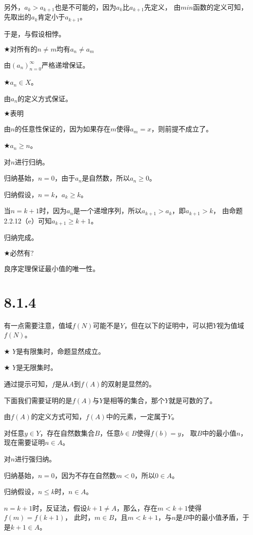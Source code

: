 \documentclass{article}
\theoremstyle{mystyle}
\begin{document}
另外，$a_k > a_{k+1}$也是不可能的，因为$a_k$比$a_{k+1}$先定义，
由$min$函数的定义可知，先取出的$a_k$肯定小于$a_{k+1}$。

于是，与假设相悖。

$\bigstar \textbf{对所有的}n \neq m \textbf{均有} a_n \neq a_m$

由$(a_n)_{n=0}^\infty$严格递增保证。

$\bigstar a_n \in X$。

由$a_n$的定义方式保证。

$\bigstar \textbf{表明}$

由$n$的任意性保证的，因为如果存在$m$使得$a_m = x$，则前提不成立了。


$\bigstar a_n \geq n$。

对$n$进行归纳。

归纳基始，$n=0$，由于$a_n$是自然数，所以$a_n \geq 0$。

归纳假设，$n=k$，$a_k \geq k$。

当$n=k+1$时，因为$a_n$是一个递增序列，所以$a_{k+1} > a_k$，即$a_{k+1} > k$，
由命题2.2.12（e）可知$a_{k+1} \geq k+1$。

归纳完成。

$\bigstar \textbf{必然有?}$

良序定理保证最小值的唯一性。

\section*{8.1.4}

有一点需要注意，值域$f(N)$可能不是$Y$，但在以下的证明中，可以把$Y$视为值域$f(N)$。

$\bigstar$ $Y$是有限集时，命题显然成立。

$\bigstar$ $Y$是无限集时。

通过提示可知，$f$是从$A$到$f(A)$的双射是显然的。

下面我们需要证明的是$f(A)$与$Y$是相等的集合，那个$Y$就是可数的了。

由$f(A)$的定义方式可知，$f(A)$中的元素，一定属于$Y$。

对任意$y \in Y$，存在自然数集合$B$，任意$b \in B$使得$f(b) = y$，
取$B$中的最小值$n$，现在需要证明$n \in A$。

对$n$进行强归纳。

归纳基始，$n = 0$，因为不存在自然数$m < 0$，所以$0 \in A$。

归纳假设，$n \leq k$时，$n \in A$。

$n = k+1$时，反证法，假设$k + 1 \neq A$，那么，存在$m < k+1$使得$f(m) = f(k+1)$，
此时，$m \in B$，且$m < k+1$，与$n$是$B$中的最小值矛盾，于是$k + 1 \in A$。
\end{document}
